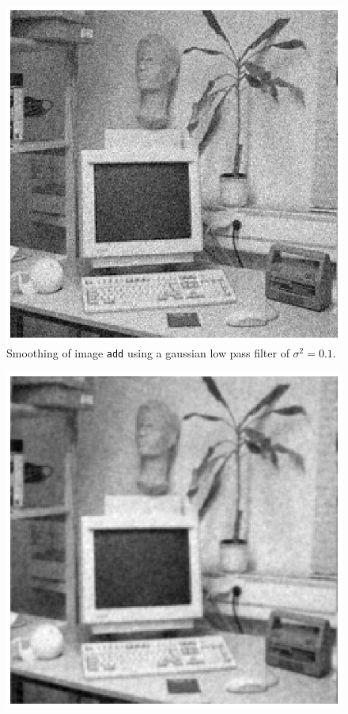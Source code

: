 \begin{minipage}{\linewidth}
  \begin{minipage}{0.4\linewidth}
    \begin{figure}[H]
      \includegraphics[scale=0.6]{./images/Q17/discgaussfft/add_01.eps}
      \caption{Smoothing of image \texttt{add} using a gaussian low pass filter of $\sigma^2 = 0.1$.}
      \label{fig:Q17_discgaussfft_add_01}
    \end{figure}
  \end{minipage}
  \hspace{0.05\linewidth}
  \begin{minipage}{0.4\linewidth}
    \begin{figure}[H]
      \includegraphics[scale=0.6]{./images/Q17/discgaussfft/add_1.eps}

\end{figure}
\end{minipage}
\end{minipage}
